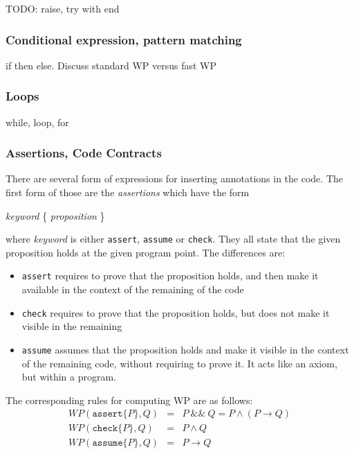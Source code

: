 TODO: raise, try with end

\subsubsection{Conditional expression, pattern matching}

if then else. Discuss standard WP versus fast WP

\subsubsection{Loops}

while, loop, for

\subsubsection{Assertions, Code Contracts}

There are several form of expressions for inserting annotations in the code.
The first form of those are the \emph{assertions} which have the form
\begin{flushleft}\ttfamily
  \textsl{keyword} \{ \textsl{proposition} \}
\end{flushleft}
where \textsl{keyword} is either \texttt{assert}, \texttt{assume} or
\texttt{check}. They all state that the given proposition holds at the given program point. The differences are:
\begin{itemize}
\item \texttt{assert} requires to prove that the proposition holds, and then make it available in the context of the remaining of the code
\item \texttt{check} requires to prove that the proposition holds, but
  does not make it visible in the remaining
\item \texttt{assume} assumes that the proposition holds and make it
  visible in the context of the remaining code, without requiring to
  prove it. It acts like an axiom, but within a program.
\end{itemize}
The corresponding rules for computing WP are as follows:
\begin{eqnarray*}
  WP(\texttt{assert} \{ P \}, Q) &=& P \mathop{\&\&} Q = P \land (P \rightarrow Q)\\
  WP(\texttt{check} \{ P \}, Q) &=& P \land Q \\
  WP(\texttt{assume} \{ P \}, Q) &=& P \rightarrow Q
\end{eqnarray*}

